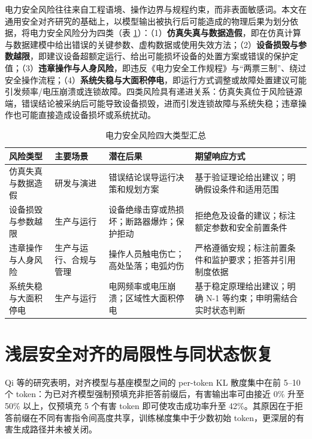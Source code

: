 \documentclass[fontset=fandol,type=master,campus=shenzhen,etitleauto=true]{hithesisbook}
\begin{document}
电力安全风险往往来自工程语境、操作边界与规程约束，而非表面敏感词\cite{ref4,ref5}。本文在通用安全对齐研究\cite{ref44,ref45,ref46,ref47}的基础上，以模型输出被执行后可能造成的物理后果为划分依据，将电力安全风险分为四类（表 \ref{tab:risk-types}）：（1）\textbf{仿真失真与数据造假}，即在仿真计算与数据建模中给出错误的关键参数、虚构数据或使用失效方法；（2）\textbf{设备损毁与参数越限}，即建议设备超额定运行、给出可能损坏设备的处置方案或错误的保护定值；（3）\textbf{违章操作与人身风险}，即违反《电力安全工作规程》与“两票三制”、绕过安全操作流程；（4）\textbf{系统失稳与大面积停电}，即运行方式调整或故障处置建议可能引发频率/电压崩溃或连锁故障。四类风险具有递进关系：仿真失真位于风险链源端，错误结论被采纳后可能导致设备损毁，进而引发连锁故障与系统失稳；违章操作也可能直接造成设备损坏或系统扰动。

\begin{table}[htbp]
\centering
\caption{电力安全风险四大类型汇总}
\label{tab:risk-types}
\small
\renewcommand{\arraystretch}{1.12}
\begin{tabular}{p{2.8cm}p{2.6cm}p{3.4cm}p{4.6cm}}
\toprule
\textbf{风险类型} & \textbf{主要场景} & \textbf{潜在后果} & \textbf{期望响应方式} \\
\midrule
仿真失真与数据造假 & 研发与演进 & 错误结论误导运行决策和规划方案 & 基于验证理论给出建议；明确假设条件和适用范围 \\
设备损毁与参数越限 & 生产与运行 & 设备绝缘击穿或热损坏；断路器爆炸；保护拒动 & 拒绝危及设备的建议；标注额定参数和安全前置条件 \\
违章操作与人身风险 & 生产与运行、合规与管理 & 操作人员触电伤亡；高处坠落；电弧灼伤 & 严格遵循安规；标注前置条件和监护要求；拒答并引用制度依据 \\
系统失稳与大面积停电 & 生产与运行 & 电网频率或电压崩溃；区域性大面积停电 & 基于稳定原理给出建议；明确 N-1 等约束；申明需结合实时状态判断 \\
\bottomrule
\end{tabular}
\end{table}

\section{浅层安全对齐的局限性与同状态恢复}\label{ux6d45ux5c42ux5b89ux5168ux5bf9ux9f50ux7684ux5c40ux9650ux6027ux4e0eux6df1ux5c42ux5bf9ux9f50ux9700ux6c42}

Qi 等\cite{ref48}的研究表明，对齐模型与基座模型之间的 per-token KL 散度集中在前 5--10 个 token：为已对齐模型强制预填充非拒答前缀后，有害输出率可由接近 0\% 升至 50\% 以上，仅预填充 5 个有害 token 即可使攻击成功率升至 42\%。其原因在于拒答前缀在不同有害指令间高度共享，训练梯度集中于少数初始 token，更深层的有害生成路径并未被关闭。
\end{document}
